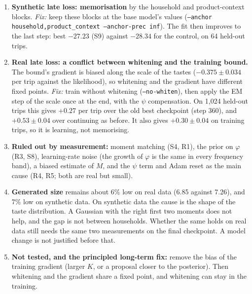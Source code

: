 \documentclass[11pt]{article}
\theoremstyle{remark}\newtheorem{remark}{Remark}
\begin{document}
\begin{enumerate}
\item \textbf{Synthetic late loss: memorisation} by the household and product-context blocks.
  \emph{Fix:} keep these blocks at the base model's values (\texttt{--anchor
  household,product\_context --anchor-prec inf}). The fit then improves to the last step: best
  $-27.23$ (S9) against $-28.34$ for the control, on 64 held-out trips.
\item \textbf{Real late loss: a conflict between whitening and the training bound.} The bound's
  gradient is biased along the scale of the tastes ($-0.375\pm0.034$ per trip against the likelihood),
  so whitening and the gradient have different fixed points. \emph{Fix:} train without whitening
  (\texttt{--no-whiten}), then apply the EM step of the scale once at the end, with the $\psi$
  compensation. On 1,024 held-out trips this gives $+0.27$ per trip over the old best checkpoint
  (step 360), and $+0.53\pm0.04$ over continuing as before. It also gives $+0.30\pm0.04$ on training
  trips, so it is learning, not memorising.
\item \textbf{Ruled out by measurement:} moment matching (S4, R1), the prior on $\varphi$ (R3, S8),
  learning-rate noise (the growth of $\varphi$ is the same in every frequency band), a biased
  estimate of $M$, and the $\psi$ term and Adam reset as the main cause (R4, R5; both are real but
  small).
\item \textbf{Generated size} remains about 6\% low on real data (6.85 against 7.26), and 7\% low on
  synthetic data. On synthetic data the cause is the shape of the taste distribution. A Gaussian
  with the right first two moments does not help, and the gap is not between households. Whether the
  same holds on real data still needs the same two measurements on the final checkpoint. A model
  change is not justified before that.
\item \textbf{Not tested, and the principled long-term fix:} remove the bias of the training
  gradient (larger $K$, or a proposal closer to the posterior). Then whitening and the gradient
  share a fixed point, and whitening can stay in the training.
\end{enumerate}
\end{document}
